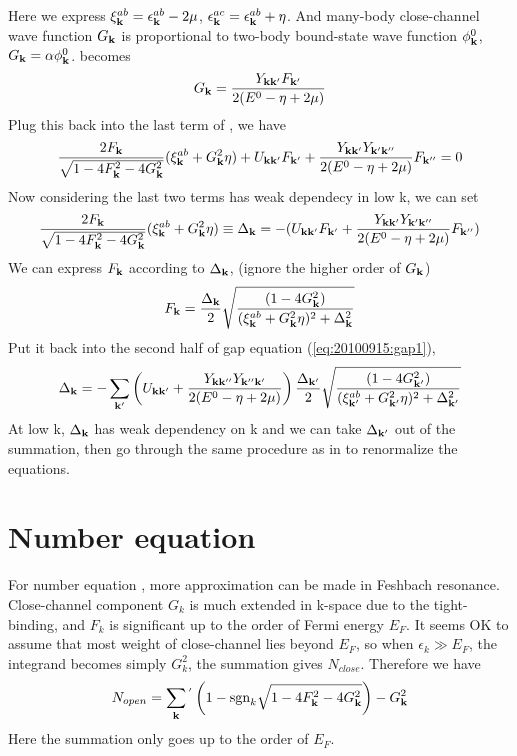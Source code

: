 Here we express $\xi^{ab}_{\mathbf{k}}=\epsilon^{ab}_{\mathbf{k}}-2\mu$, $\epsilon^{ac}_{\mathbf{k}}=\epsilon^{ab}_{\mathbf{k}}+\eta$.  And many-body close-channel wave function $G_{\mathbf{k}}$ is proportional to two-body bound-state wave function $\phi_{\mathbf{k}}^{0}$,  $G_{\mathbf{k}}=\alpha\phi^{0}_{\mathbf{k}}$. 
 becomes
\begin{equation}\label{eq:20100915:GF}
G_{\mathbf{k}}=\frac{Y_{\mathbf{k}\mathbf{k}'}F_{\mathbf{k}'}}{2(E^{0}-\eta+2\mu)}
\end{equation}
Plug this back into the last term of , we have 
\begin{equation}
\frac{2F_{\mathbf{k}}}{\sqrt{1-4 F_{\mathbf{k}}^2-4 G_{\mathbf{k}}^2}} (\xi^{ab}_{\mathbf{k}}+  G_{\mathbf{k}}^2\eta)+U_{\mathbf{k}\mathbf{k}'}F_{\mathbf{k}'}+\frac{Y_{\mathbf{k}\mathbf{k}'}Y_{\mathbf{k}'\mathbf{k}''}}{2(E^{0}-\eta+2\mu)}F_{\mathbf{k}''}=0
\end{equation}
Now considering the last two terms has weak dependecy in low k, we can set 
\begin{equation}\label{eq:20100915:gap1}
\frac{2F_{\mathbf{k}}}{\sqrt{1-4 F_{\mathbf{k}}^2-4 G_{\mathbf{k}}^2}} (\xi^{ab}_{\mathbf{k}}+  G_{\mathbf{k}}^2\eta)\equiv\Delta_{\mathbf{k}}=-(U_{\mathbf{k}\mathbf{k}'}F_{\mathbf{k}'}+\frac{Y_{\mathbf{k}\mathbf{k}'}Y_{\mathbf{k}'\mathbf{k}''}}{2(E^{0}-\eta+2\mu)}F_{\mathbf{k}''})
\end{equation}
We can express $F_{\mathbf{k}}$ according to $\Delta_{\mathbf{k}}$,  (ignore the higher order of $G_{\mathbf{k}}$)
\begin{equation}\label{eq:20100915:F}
F_{\mathbf{k}}=\frac{\Delta_{\mathbf{k}}}2\sqrt{\frac{(1-4G_{\mathbf{k}}^{2})}{(\xi^{ab}_{\mathbf{k}}+  G_{\mathbf{k}}^2\eta)^{2}+\Delta_{\mathbf{k}}^{2}}}
\end{equation}
Put it back into the second half of gap equation (\ref{eq:20100915:gap1}), 
\begin{equation}\label{eq:20100915:onechannel}
\Delta_{\mathbf{k}}=-\sum_{\mathbf{k}'}\left(U_{\mathbf{k}\mathbf{k}'}+\frac{Y_{\mathbf{k}\mathbf{k}''}Y_{\mathbf{k}''\mathbf{k}'}}{2(E^{0}-\eta+2\mu)}\right)\frac{\Delta_{\mathbf{k}'}}2\sqrt{\frac{(1-4G_{\mathbf{k}'}^{2})}{(\xi^{ab}_{\mathbf{k}'}+  G_{\mathbf{k}'}^2\eta)^{2}+\Delta_{\mathbf{k}'}^{2}}}
\end{equation}
At low k, $\Delta_{\mathbf{k}}$ has weak dependency on k and we can take $\Delta_{\mathbf{k}'}$ out of the summation,  then go through the same procedure as in \cite{Leggett,Fetter} to renormalize the equations. 

\section{Number equation}
For number equation , more approximation can be made in Feshbach resonance.  Close-channel component $G_{k}$ is much extended in k-space due to the tight-binding, and $F_{k}$ is significant up to the order of Fermi energy $E_{F}$.  It seems OK to assume that most weight of close-channel lies beyond $E_{F}$, so when $\epsilon_{k}\gg{E_{F}}$, the integrand becomes simply $G_{k}^{2}$, the summation gives $N_{close}$.  Therefore we have 
\begin{equation}\label{eq:20101004:number}
N_{open}=\sum_{\mathbf{k}}{}^{'}\left(1-\text{sgn}_{k}\sqrt{1-4 F_{\mathbf{k}}^2-4 G_{\mathbf{k}}^2}\right)-G_{\mathbf{k}}^{2}
\end{equation} 
Here the summation only goes up to the order of $E_{F}$.


